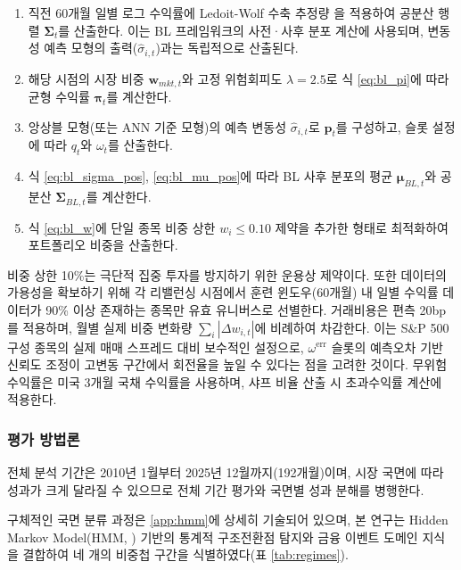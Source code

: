 \documentclass[eng]{kjas3}
\begin{document}
\begin{enumerate}
  \item 직전 60개월 일별 로그 수익률에 Ledoit-Wolf 수축 추정량 \citep{ledoitwolf2004}을 적용하여 공분산 행렬 $\boldsymbol{\Sigma}_t$를 산출한다. 이는 BL 프레임워크의 사전·사후 분포 계산에 사용되며, 변동성 예측 모형의 출력($\hat{\sigma}_{i,t}$)과는 독립적으로 산출된다.
  \item 해당 시점의 시장 비중 $\mathbf{w}_{mkt,t}$와 고정 위험회피도 $\lambda = 2.5$로 식 \eqref{eq:bl_pi}에 따라 균형 수익률 $\boldsymbol{\pi}_t$를 계산한다.
  \item 앙상블 모형(또는 ANN 기준 모형)의 예측 변동성 $\hat{\sigma}_{i,t}$로 $\mathbf{p}_t$를 구성하고, 슬롯 설정에 따라 $q_t$와 $\omega_t$를 산출한다.
  \item 식 \eqref{eq:bl_sigma_pos}, \eqref{eq:bl_mu_pos}에 따라 BL 사후 분포의 평균 $\boldsymbol{\mu}_{BL,t}$와 공분산 $\boldsymbol{\Sigma}_{BL,t}$를 계산한다.
  \item 식 \eqref{eq:bl_w}에 단일 종목 비중 상한 $w_i \leq 0.10$ 제약을 추가한 형태로 최적화하여 포트폴리오 비중을 산출한다.
\end{enumerate}

비중 상한 10\%는 극단적 집중 투자를 방지하기 위한 운용상 제약이다. 또한 데이터의 가용성을 확보하기 위해 각 리밸런싱 시점에서 훈련 윈도우(60개월) 내 일별 수익률 데이터가 90\% 이상 존재하는 종목만 유효 유니버스로 선별한다. 거래비용은 편측 20bp를 적용하며, 월별 실제 비중 변화량 $\sum_i |\Delta w_{i,t}|$에 비례하여 차감한다. 이는 S\&P 500 구성 종목의 실제 매매 스프레드 대비 보수적인 설정으로, $\omega^{\mathrm{err}}$ 슬롯의 예측오차 기반 신뢰도 조정이 고변동 구간에서 회전율을 높일 수 있다는 점을 고려한 것이다. 무위험 수익률은 미국 3개월 국채 수익률을 사용하며, 샤프 비율 산출 시 초과수익률 계산에 적용한다.

\subsubsection{평가 방법론}
\label{subsubsec:bl_eval}

전체 분석 기간은 2010년 1월부터 2025년 12월까지(192개월)이며, 시장 국면에 따라 성과가 크게 달라질 수 있으므로 전체 기간 평가와 국면별 성과 분해를 병행한다.

구체적인 국면 분류 과정은 \ref{app:hmm}에 상세히 기술되어 있으며, 본 연구는 Hidden Markov Model(HMM, \citealp{hamilton1989new}) 기반의 통계적 구조전환점 탐지와 금융 이벤트 도메인 지식을 결합하여 네 개의 비중첩 구간을 식별하였다(표 \ref{tab:regimes}).
\end{document}
